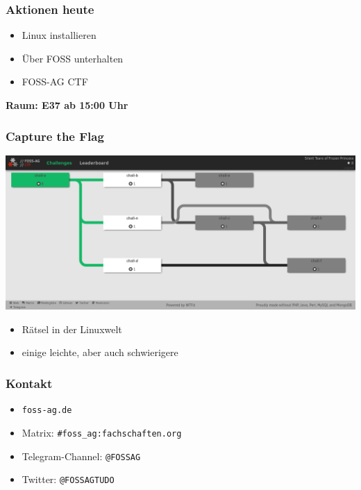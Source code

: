 \documentclass[12pt,utf8]{beamer}
\begin{document}
	\begin{frame}
		\frametitle{Aktionen heute}
		\begin{itemize}
			\item Linux installieren
			\item Über FOSS unterhalten
			\item FOSS-AG CTF	
		\end{itemize}
	\textbf{Raum: E37 ab 15:00 Uhr}
	\end{frame}
	
	\begin{frame}
		\frametitle{Capture the Flag}
		\includegraphics[width=\linewidth]{resources/screenshot_ctf.png}
		\begin{itemize}
			\item Rätsel in der Linuxwelt
			\item einige leichte, aber auch schwierigere
		\end{itemize}
	\end{frame}
	
	\begin{frame}
		\frametitle{Kontakt}
		\begin{itemize}
			\item \texttt{foss-ag.de}
			\item Matrix: \texttt{\#foss\_ag:fachschaften.org}
			\item Telegram-Channel: \texttt{@FOSSAG}
			\item Twitter: \texttt{@FOSSAGTUDO}	
			
		\end{itemize}
	\end{frame}
\end{document}
